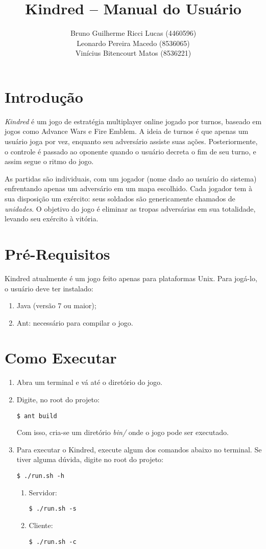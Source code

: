 \documentclass{article}
\title{
    Kindred -- Manual do Usuário
}
\author{
    Bruno Guilherme Ricci Lucas (4460596)\\
    Leonardo Pereira Macedo (8536065)\\
    Vinícius Bitencourt Matos (8536221)
}
\begin{document}
\maketitle

\section{Introdução}

\emph{Kindred} é um jogo de estratégia multiplayer online jogado por turnos, baseado em jogos como Advance Wars e Fire Emblem. A ideia de turnos é que apenas um usuário joga por vez, enquanto seu adversário assiste suas ações. Posteriormente, o controle é passado ao oponente quando o usuário decreta o fim de seu turno, e assim segue o ritmo do jogo. \par

As partidas são individuais, com um jogador (nome dado ao usuário do sistema) enfrentando apenas um adversário em um mapa escolhido. Cada jogador tem à sua disposição um exército: seus soldados são genericamente chamados de \emph{unidades}. O objetivo do jogo é eliminar as tropas adversárias em sua totalidade, levando seu exército à vitória.

\section{Pré-Requisitos}
Kindred atualmente é um jogo feito apenas para plataformas Unix. Para jogá-lo, o usuário deve ter instalado:
    \begin{enumerate}
        \item Java (versão 7 ou maior);
        \item Ant: necessário para compilar o jogo.
    \end{enumerate}

\section{Como Executar}
    \begin{enumerate}
    \item Abra um terminal e vá até o diretório do jogo.
    \item Digite, no root do projeto: \par
            \texttt{\$ ant build} \par
            Com isso, cria-se um diretório \emph{bin/} onde o jogo pode ser executado.
    \item Para executar o Kindred, execute algum dos comandos abaixo no terminal. Se tiver alguma dúvida, digite no root do projeto: \par
            \texttt{\$ ./run.sh -h} \par
        \begin{enumerate}
        \item Servidor: \par
                \texttt{\$ ./run.sh -s}
        \item Cliente: \par
                \texttt{\$ ./run.sh -c}
        \end{enumerate}
    \end{enumerate}
\end{document}
